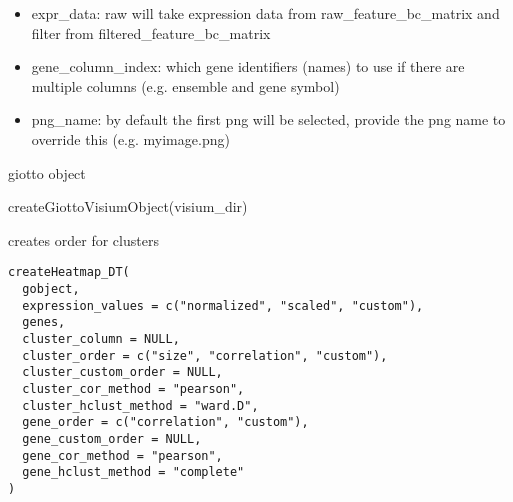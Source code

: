 \documentclass[a4paper]{book}
\begin{document}
%
\begin{Details}\relax
\begin{itemize}

\item{} expr\_data: raw will take expression data from raw\_feature\_bc\_matrix and filter from filtered\_feature\_bc\_matrix 
\item{} gene\_column\_index: which gene identifiers (names) to use if there are multiple columns (e.g. ensemble and gene symbol)
\item{} png\_name: by default the first png will be selected, provide the png name to override this (e.g. myimage.png)

\end{itemize}

\end{Details}
%
\begin{Value}
giotto object
\end{Value}
%
\begin{Examples}
\begin{ExampleCode}
    createGiottoVisiumObject(visium_dir)
\end{ExampleCode}
\end{Examples}
%
\begin{Description}\relax
creates order for clusters
\end{Description}
%
\begin{Usage}
\begin{verbatim}
createHeatmap_DT(
  gobject,
  expression_values = c("normalized", "scaled", "custom"),
  genes,
  cluster_column = NULL,
  cluster_order = c("size", "correlation", "custom"),
  cluster_custom_order = NULL,
  cluster_cor_method = "pearson",
  cluster_hclust_method = "ward.D",
  gene_order = c("correlation", "custom"),
  gene_custom_order = NULL,
  gene_cor_method = "pearson",
  gene_hclust_method = "complete"
)
\end{verbatim}
\end{Usage}
%
\end{document}
